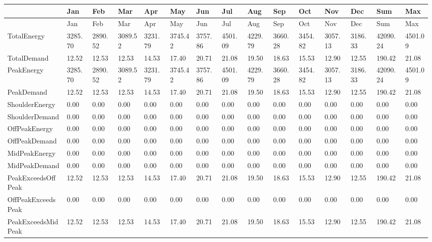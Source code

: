{\tiny
\begin{longtable}[c]{>{\raggedright}p{0.4in}>{\raggedright}p{0.4in}>{\raggedright}p{0.4in}>{\raggedright}p{0.4in}>{\raggedright}p{0.4in}>{\raggedright}p{0.4in}>{\raggedright}p{0.4in}>{\raggedright}p{0.4in}>{\raggedright}p{0.4in}>{\raggedright}p{0.4in}>{\raggedright}p{0.4in}>{\raggedright}p{0.4in}>{\raggedright}p{0.4in}>{\raggedright}p{0.4in}>{\raggedright}p{0.4in}}
\toprule 
~ & Jan & Feb & Mar & Apr & May & Jun & Jul & Aug & Sep & Oct & Nov & Dec & Sum & Max \tabularnewline
\midrule
\endfirsthead

\toprule 
~ & Jan & Feb & Mar & Apr & May & Jun & Jul & Aug & Sep & Oct & Nov & Dec & Sum & Max \tabularnewline
\midrule
\endhead

Total\-Energy & 3285.70 & 2890.52 & 3089.52 & 3231.79 & 3745.42 & 3757.86 & 4501.09 & 4229.79 & 3660.28 & 3454.82 & 3057.13 & 3186.33 & 42090.24 & 4501.09 \tabularnewline
Total\-Demand & 12.52 & 12.53 & 12.53 & 14.53 & 17.40 & 20.71 & 21.08 & 19.50 & 18.63 & 15.53 & 12.90 & 12.55 & 190.42 & 21.08 \tabularnewline
Peak\-Energy & 3285.70 & 2890.52 & 3089.52 & 3231.79 & 3745.42 & 3757.86 & 4501.09 & 4229.79 & 3660.28 & 3454.82 & 3057.13 & 3186.33 & 42090.24 & 4501.09 \tabularnewline
Peak\-Demand & 12.52 & 12.53 & 12.53 & 14.53 & 17.40 & 20.71 & 21.08 & 19.50 & 18.63 & 15.53 & 12.90 & 12.55 & 190.42 & 21.08 \tabularnewline
Shoulder\-Energy & 0.00 & 0.00 & 0.00 & 0.00 & 0.00 & 0.00 & 0.00 & 0.00 & 0.00 & 0.00 & 0.00 & 0.00 & 0.00 & 0.00 \tabularnewline
Shoulder\-Demand & 0.00 & 0.00 & 0.00 & 0.00 & 0.00 & 0.00 & 0.00 & 0.00 & 0.00 & 0.00 & 0.00 & 0.00 & 0.00 & 0.00 \tabularnewline
OffPeak\-Energy & 0.00 & 0.00 & 0.00 & 0.00 & 0.00 & 0.00 & 0.00 & 0.00 & 0.00 & 0.00 & 0.00 & 0.00 & 0.00 & 0.00 \tabularnewline
OffPeak\-Demand & 0.00 & 0.00 & 0.00 & 0.00 & 0.00 & 0.00 & 0.00 & 0.00 & 0.00 & 0.00 & 0.00 & 0.00 & 0.00 & 0.00 \tabularnewline
MidPeak\-Energy & 0.00 & 0.00 & 0.00 & 0.00 & 0.00 & 0.00 & 0.00 & 0.00 & 0.00 & 0.00 & 0.00 & 0.00 & 0.00 & 0.00 \tabularnewline
MidPeak\-Demand & 0.00 & 0.00 & 0.00 & 0.00 & 0.00 & 0.00 & 0.00 & 0.00 & 0.00 & 0.00 & 0.00 & 0.00 & 0.00 & 0.00 \tabularnewline
Peak\-Exceeds\-OffPeak & 12.52 & 12.53 & 12.53 & 14.53 & 17.40 & 20.71 & 21.08 & 19.50 & 18.63 & 15.53 & 12.90 & 12.55 & 190.42 & 21.08 \tabularnewline
OffPeak\-Exceeds\-Peak & 0.00 & 0.00 & 0.00 & 0.00 & 0.00 & 0.00 & 0.00 & 0.00 & 0.00 & 0.00 & 0.00 & 0.00 & 0.00 & 0.00 \tabularnewline
Peak\-Exceeds\-Mid\-Peak & 12.52 & 12.53 & 12.53 & 14.53 & 17.40 & 20.71 & 21.08 & 19.50 & 18.63 & 15.53 & 12.90 & 12.55 & 190.42 & 21.08 \tabularnewline

\end{longtable}}
